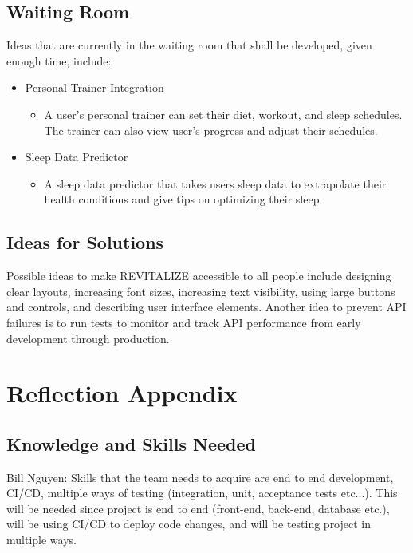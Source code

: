 \documentclass[12pt,letterpaper]{article}
\begin{document}
\subsection{Waiting Room}
Ideas that are currently in the waiting room that shall be developed, given enough time, include:
\begin{itemize}
	\item Personal Trainer Integration
	\begin{itemize}
		\item A user's personal trainer can set their diet, workout, and sleep schedules. The trainer can also view user's progress and adjust their schedules.
	\end{itemize}
	\item Sleep Data Predictor
	\begin{itemize}
		\item A sleep data predictor that takes users sleep data to extrapolate their health conditions and give tips on optimizing their sleep.
	\end{itemize}
\end{itemize}

\subsection{Ideas for Solutions}
Possible ideas to make REVITALIZE accessible to all people include designing clear layouts, increasing font sizes, increasing text visibility, using large buttons and controls, and describing user interface elements. Another idea to prevent API failures is to run tests to monitor and track API performance from early development through production.

\section{Reflection Appendix}

\subsection{Knowledge and Skills Needed}

\noindent Bill Nguyen: Skills that the team needs to acquire are end to end development, CI/CD, multiple ways of testing (integration, unit, acceptance tests etc...). This will be needed since project is end to end (front-end, back-end, database etc.), will be using CI/CD to deploy code changes, and will be testing project in multiple ways.\\
\end{document}
